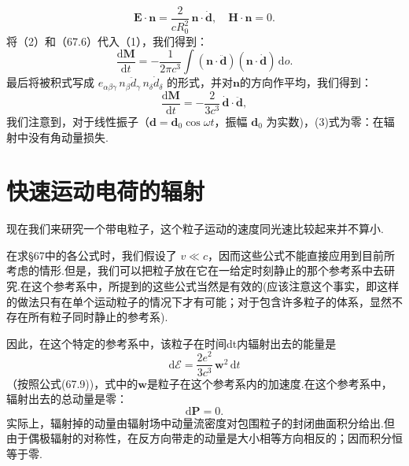 \begin{xiti}
\begin{equation*}
  \boldsymbol{E}\cdot\boldsymbol{n}=\frac{2}{cR_0^2}\,\boldsymbol{n}\cdot\dot{\boldsymbol{d}},\quad
  \boldsymbol{H}\cdot\boldsymbol{n}=0.\tag{2}
\end{equation*}
将（2）和（67.6）代入（1），我们得到：
\begin{equation*}
  \frac{\mathrm{d}\boldsymbol{M}}{\mathrm{d}t}=-\frac{1}{2\pi c^3}\int(\boldsymbol{n}\cdot\ddot{\boldsymbol{d}})(\boldsymbol{n}\cdot\dot{\boldsymbol{d}})\,\mathrm{d}o.
\end{equation*}
最后将被积式写成 $e_{\alpha\beta\gamma}\,n_\beta\ddot{d}_\gamma\,n_\delta\dot{d}_\delta$ 的形式，并对$\boldsymbol{n}$的方向作平均，我们得到：
\begin{equation*}
  \frac{\mathrm{d}\boldsymbol{M}}{\mathrm{d}t}=-\frac{2}{3c^3}\,\dot{\boldsymbol{d}}\cdot\ddot{\boldsymbol{d}},\tag{3}
\end{equation*}
我们注意到，对于线性振子（$\boldsymbol{d}=\boldsymbol{d}_0\cos\omega t$，振幅 $\boldsymbol{d}_0$ 为实数)，(3)式为零：在辐射中没有角动量损失.

\end{xiti}

\section{快速运动电荷的辐射}

现在我们来研究一个带电粒子，这个粒子运动的速度同光速比较起来并不算小.

在求§67中的各公式时，我们假设了 $v\ll c$，因而这些公式不能直接应用到目前所考虑的情形.但是，我们可以把粒子放在它在一给定时刻静止的那个参考系中去研究.在这个参考系中，所提到的这些公式当然是有效的(应该注意这个事实，即这样的做法只有在单个运动粒子的情况下才有可能；对于包含许多粒子的体系，显然不存在所有粒子同时静止的参考系).

因此，在这个特定的参考系中，该粒子在时间dt内辐射出去的能量是
\begin{equation}
  \mathrm{d}\mathcal{E}=\frac{2e^2}{3c^3}\,\boldsymbol{w}^2\,\mathrm{d}t
\end{equation}
（按照公式(67.9))，式中的$\boldsymbol{w}$是粒子在这个参考系内的加速度.在这个参考系中，辐射出去的总动量是零：
\begin{equation}
  \mathrm{d}\boldsymbol{P}=0.
\end{equation}
实际上，辐射掉的动量由辐射场中动量流密度对包围粒子的封闭曲面积分给出.但由于偶极辐射的对称性，在反方向带走的动量是大小相等方向相反的；因而积分恒等于零.

